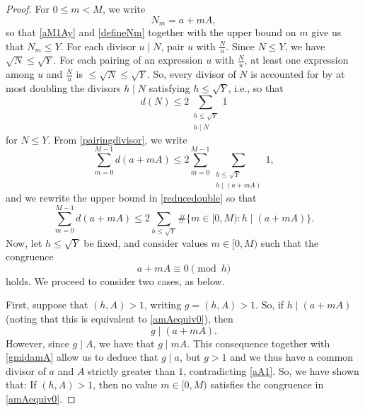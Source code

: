 \documentclass[12pt]{article}
\begin{document}
\begin{proof}
 For $0 \leq m < M$, we write
\begin{equation}\label{defineNm} 
 N_{m} = a + m A, 
\end{equation}
 so that \eqref{aM1Ay} and \eqref{defineNm} together with the upper bound on $m$ give us that $N_{m} \leq Y$. For each divisor $u 
 \mid N$, pair $u$ with $\frac{N}{u}$. Since $N \leq Y$, we have $\sqrt{N} \leq \sqrt{Y}$. 
 For each pairing of an expression $ u$ with $ \frac{N}{u}$, 
 at least one expression among $u$ and $\frac{N}{u}$ is $\leq \sqrt{N} \leq \sqrt{Y}$. 
 So, every divisor of $N$ is accounted for by at most doubling the divisors $h \mid N$ satisfying $h \leq \sqrt{Y}$, 
 i.e., so that 
\begin{equation}\label{pairingdivisor}
 d(N) \leq 2 \sum_{\substack{h \leq \sqrt{Y} \\ h \mid N}} 1 
\end{equation}
 for $N \leq Y$. From \eqref{pairingdivisor}, we write
\begin{equation}\label{reducedouble}
 \sum_{m=0}^{M-1} d(a + m A) \leq 2 \sum_{m=0}^{M-1} \sum_{\substack{ h \leq \sqrt{Y} \\ h \mid (a + m A) }} 1, 
\end{equation}
 and we rewrite the upper bound in \eqref{reducedouble} so that 
\begin{equation}\label{rewritehash} 
 \sum_{m=0}^{M-1} d(a + mA) \leq 2 \sum_{h \leq \sqrt{Y}} \#\{ m \in [0, M) : 
 h \mid (a + m A) \}. 
\end{equation}
 Now, let $h \leq \sqrt{Y}$ be fixed, 
 and consider values $m \in [0, M)$ such that the congruence
\begin{equation}\label{amAequiv0}
 a + m A \equiv 0 \pmod h 
\end{equation} 
 holds. We proceed to consider two cases, as below. 

 First, suppose that $(h, A) > 1$, writing $g = (h, A) > 1$. So, if $h \mid (a + mA)$ (noting that this is equivalent to 
 \eqref{amAequiv0}), then 
\begin{equation}\label{gmidamA}
 g \mid (a + m A). 
\end{equation}
 However, since $g \mid A$, we have that $g \mid mA$. This consequence together with \eqref{gmidamA} allow us to deduce that $g 
 \mid a$, but $g > 1$ and we thus have a common divisor of $a$ and $A$ strictly greater than $1$, 
 contradicting \eqref{aA1}. 
 So, we have shown that: If $(h, A) > 1$, then no value $m \in [0, M)$ satisfies the congruence in \eqref{amAequiv0}. 


\end{proof}
\end{document}
